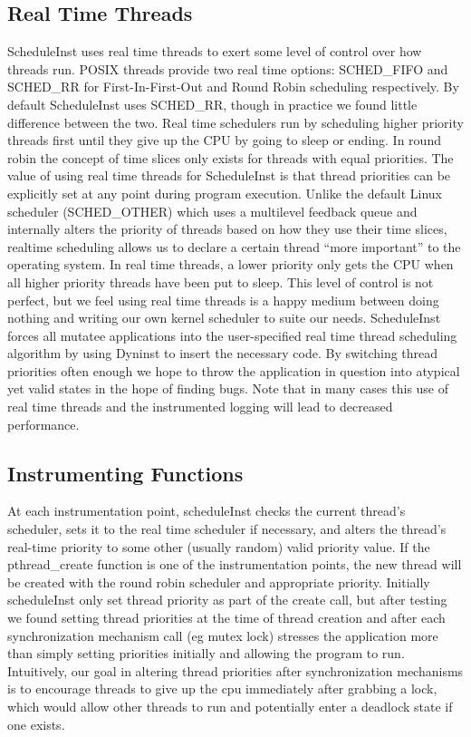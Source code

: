 \documentclass[10pt,]{article} %
\begin{document}
\subsection{Real Time Threads}

ScheduleInst uses real time threads to exert some level of control over how threads run.  POSIX threads provide two real time options: SCHED\_FIFO and SCHED\_RR for First-In-First-Out and Round Robin scheduling respectively.  By default ScheduleInst uses SCHED\_RR, though in practice we found little difference between the two.  Real time schedulers run by scheduling higher priority threads first until they give up the CPU by going to sleep or ending.  In round robin the concept of time slices only exists for threads with equal priorities. The value of using real time threads for ScheduleInst is that thread priorities can be explicitly set at any point during program execution.  Unlike the default Linux scheduler (SCHED\_OTHER) which uses a multilevel feedback queue and internally alters the priority of threads based on how they use their time slices, realtime scheduling allows us to declare a certain thread “more important” to the operating system.  In real time threads, a lower priority only gets the CPU when all higher priority threads have been put to sleep.  This level of control is not perfect, but we feel using real time threads is a happy medium between doing nothing and writing our own kernel scheduler to suite our needs.  ScheduleInst forces all mutatee applications into the user-specified real time thread scheduling algorithm by using Dyninst to insert the necessary code.  By switching thread priorities often enough we hope to throw the application in question into atypical yet valid states in the hope of finding bugs.  Note that in many cases this use of real time threads and the instrumented logging will lead to decreased performance. 




\subsection{Instrumenting Functions}

At each instrumentation point, scheduleInst checks the current thread’s scheduler, sets it to the real time scheduler if necessary, and alters the thread’s real-time priority to some other (usually random) valid priority value.  If the pthread\_create function is one of the instrumentation points, the new thread will be created with the round robin scheduler and appropriate priority.  Initially scheduleInst only set thread priority as part of the create call, but after testing we found setting thread priorities at the time of thread creation and after each synchronization mechanism call (eg mutex lock) stresses the application more than simply setting priorities initially and allowing the program to run.  Intuitively, our goal in altering thread priorities after synchronization mechanisms is to encourage threads to give up the cpu immediately after grabbing a lock, which would allow other threads to run and potentially enter a deadlock state if one exists. 
\end{document}
